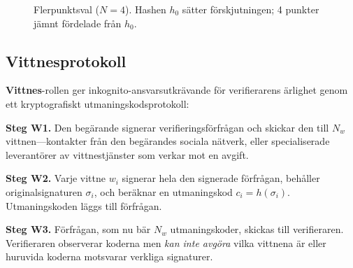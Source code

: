 \documentclass[11pt,a4paper,twocolumn]{article}
\begin{document}
\begin{figure}[ht]
\centering
{}
\caption{Flerpunktsval ($N{=}4$). Hashen $h_0$ sätter förskjutningen; 4 punkter jämnt fördelade från $h_0$.}
\label{fig:multipoint}
\end{figure}

\subsection{Vittnesprotokoll}

\textbf{Vittnes}-rollen ger inkognito-ansvarsutkrävande för verifierarens ärlighet genom ett kryptografiskt utmaningskodsprotokoll:

\textbf{Steg W1.} Den begärande signerar verifieringsförfrågan och skickar den till $N_w$ vittnen---kontakter från den begärandes sociala nätverk, eller specialiserade leverantörer av vittnestjänster som verkar mot en avgift.

\textbf{Steg W2.} Varje vittne $w_i$ signerar hela den signerade förfrågan, behåller originalsignaturen $\sigma_i$, och beräknar en utmaningskod $c_i = h(\sigma_i)$. Utmaningskoden läggs till förfrågan.

\textbf{Steg W3.} Förfrågan, som nu bär $N_w$ utmaningskoder, skickas till verifieraren. Verifieraren observerar koderna men \emph{kan inte avgöra} vilka vittnena är eller huruvida koderna motsvarar verkliga signaturer.
\end{document}
